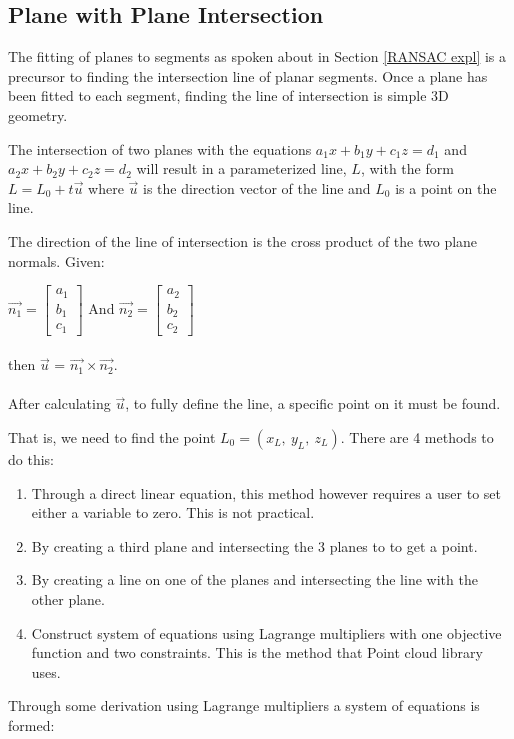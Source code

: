 	\subsection{Plane with Plane Intersection}
	\label{plane-planeInter}
	The fitting of planes to segments as spoken about in Section \ref{RANSAC expl} is a precursor to finding the intersection line of planar segments. Once a plane has been fitted to each segment, finding the line of intersection is simple 3D geometry.
	
	The intersection of two planes with the equations $a_1x + b_1y + c_1z = d_1$ and $a_2x + b_2y + c_2z = d_2$ will result in a parameterized line, $L$, with the form $L = L_0 + t\vec{u}$ where $\vec{u}$ is the direction vector of the line and $L_0$ is a point on the line.
	
	The direction of the line of intersection is the cross product of the two plane normals. Given:
	
	$\vec{n_1} = \begin{bmatrix}a_1\\b_1\\c_1\end{bmatrix}$  And $\vec{n_2} = \begin{bmatrix}a_2\\b_2\\c_2\end{bmatrix}$\\
	\\
	then $\vec{u}$  =  $\vec{n_1} \times \vec{n_2}  $.\\
	\\
	After calculating $\vec{u}$, to fully define the line, a specific point on it must be found.
	
	That is, we need to find the point $L_0 = (x_L,\:y_L,\:z_L)$. There are 4 methods to do this:
	\begin{enumerate}
	\item Through a direct linear equation, this method however requires a user to set either a variable to zero. This is not practical.
	
	\item By creating a third plane and intersecting the 3 planes to to get a point.
	
	\item By creating a line on one of the planes and intersecting the line with the other plane. 
	
	\item Construct system of equations using Lagrange multipliers with one objective function and two constraints. This is the method that Point cloud library uses.
	\end{enumerate}
	\newpage
	Through some derivation using Lagrange multipliers a system of equations is formed:
	

